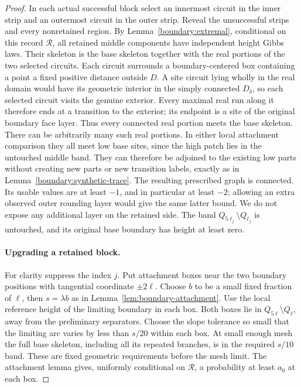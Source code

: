 \begin{proof}
In each actual successful block select an innermost circuit in the
inner strip and an outermost circuit in the outer strip.  Reveal
the unsuccessful strips and every nonretained region.  By
Lemma~\ref{boundary:extremal}, conditional on this record
$\mathcal R$, all retained middle components have independent height
Gibbs laws.  Their skeleton is the base skeleton together with the
real portions of the two selected circuits.  Each circuit surrounds
a boundary-centered box containing a point a fixed positive distance
outside $D$.  A site circuit lying wholly in the real domain would
have its geometric interior in the simply connected $D_\delta$,
so each selected circuit visits the genuine exterior.  Every maximal
real run along it therefore ends at a transition to the exterior;
its endpoint is a site of the original boundary face layer.  Thus
every connected real portion meets the base skeleton.  There can be
arbitrarily many such real portions.  In either local attachment
comparison they all meet low base sites, since the high patch lies
in the untouched middle band.  They can therefore be adjoined to
the existing low parts without creating new parts or new transition
labels, exactly as in Lemma~\ref{boundary:synthetic-trace}.
The resulting prescribed graph is connected.  Its usable values are
at least $-1$, and in particular at least $-2$; allowing an extra observed
outer rounding layer would give the same latter bound.  We do not
expose any additional layer on the retained side.  The band
$Q_{5\ell_j}\setminus Q_{\ell_j}$ is untouched, and its original
base boundary has height at least zero.

\paragraph{Upgrading a retained block.}
For clarity suppress the index $j$.  Put attachment boxes near the
two boundary positions with tangential coordinate $\pm2\ell$.
Choose $b$ to be a small fixed fraction of $\ell$, then
$s=\lambda b$ as in Lemma~\ref{lem:boundary-attachment}.  Use the
local reference height of the limiting boundary in each box.
Both boxes lie in $Q_{5\ell}\setminus Q_\ell$, away from the
preliminary separators.  Choose the slope tolerance so small that
the limiting arc varies by less than $s/20$ within each box.  At
small enough mesh the full base skeleton, including all its
repeated branches, is in the required $s/10$ band.  These are fixed
geometric requirements before the mesh limit.  The attachment
lemma gives, uniformly conditional on $\mathcal R$, a probability
at least $a_0$ at each box.


\end{proof}
